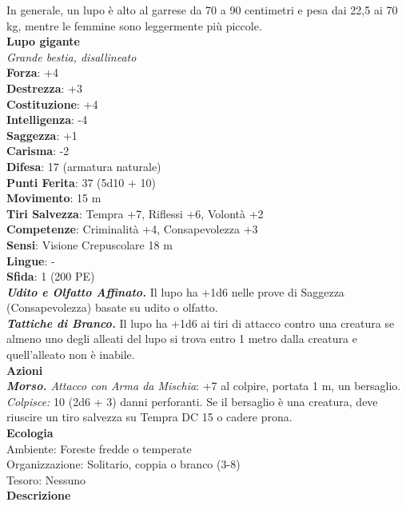 \begin{multicols}{2}
In generale, un lupo è alto al garrese da 70 a 90 centimetri e pesa dai 22,5 ai 70 kg, mentre le femmine sono leggermente più piccole. \\

\medskip\textbf{Lupo gigante}\\
\emph{Grande bestia, disallineato}\\
\textbf{Forza}: +4\\
\textbf{Destrezza}: +3\\
\textbf{Costituzione}: +4\\
\textbf{Intelligenza}: -4\\
\textbf{Saggezza}: +1\\
\textbf{Carisma}: -2\\
\textbf{Difesa}: 17 (armatura naturale)\\
\textbf{Punti Ferita}: 37 (5d10 + 10)\\
\textbf{Movimento}: 15 m\\
\textbf{Tiri Salvezza}: Tempra +7, Riflessi +6, Volontà +2 \\
\textbf{Competenze}: Criminalità +4, Consapevolezza +3\\
\textbf{Sensi}: Visione Crepuscolare 18 m\\
\textbf{Lingue}: -\\
\textbf{Sfida}: 1 (200 PE)\smallskip\\
\emph{\textbf{Udito e Olfatto Affinato.}} Il lupo ha +1d6 nelle prove di Saggezza (Consapevolezza) basate su udito o olfatto.\\
\emph{\textbf{Tattiche di Branco.}} Il lupo ha +1d6 ai tiri di attacco contro una creatura se almeno uno degli alleati del lupo si trova entro 1 metro dalla creatura e quell'alleato non è inabile.\\
\smallskip\textbf{Azioni}\\
\emph{\textbf{Morso.} Attacco con Arma da Mischia}: +7 al colpire, portata 1 m, un bersaglio.\\
\emph{Colpisce:} 10 (2d6 + 3) danni perforanti. Se il bersaglio è una creatura, deve riuscire un tiro salvezza su Tempra DC  15 o cadere prona.\\
\textbf{Ecologia}\\
Ambiente: Foreste fredde o temperate\\
Organizzazione: Solitario, coppia o branco (3-8)\\
Tesoro: Nessuno\\
\textbf{Descrizione}\\


\end{multicols}
